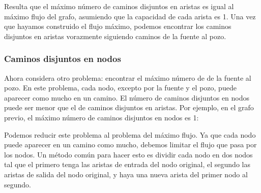 Resulta que el máximo número de caminos disjuntos en aristas es igual
al máximo flujo del grafo, asumiendo que la capacidad de cada arista
es 1. Una vez que hayamos construido el flujo máximo, podemos encontrar
los caminos disjuntos en aristas vorazmente siguiendo caminos de la
fuente al pozo.

\subsubsection{Caminos disjuntos en nodos}

Ahora considera otro problema: encontrar el máximo número de
 de la fuente al pozo. En este problema,
cada nodo, excepto por la fuente y el pozo, puede aparecer como mucho
en un camino. El número de caminos disjuntos en nodos puede ser
menor que el de caminos disjuntos en aristas. Por ejemplo, en el
grafo previo, el máximo número de caminos disjuntos en nodos es 1:

\begin{center}
\end{center}

Podemos reducir este problema al problema del máximo flujo. Ya que
cada nodo puede aparecer en un camino como mucho, debemos limitar el
flujo que pasa por los nodos. Un método común para hacer esto es
dividir cada nodo en dos nodos tal que el primero tenga las aristas
de entrada del nodo original, el segundo las aristas de salida del
nodo original, y haya una nueva arista del primer nodo al segundo.

